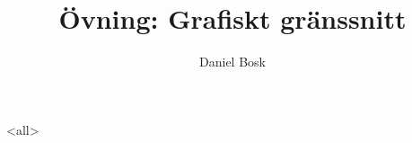 \documentclass[ignoreframetext]{beamer}
\begin{document}
\title{%
  Övning: Grafiskt gränssnitt
}
\author{Daniel Bosk}

\begin{frame}
  \maketitle
\end{frame}

\mode<all>

\mode*
%
\end{document}
